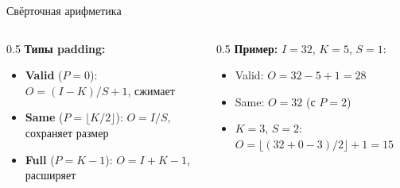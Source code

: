 \documentclass[aspectratio=169, 9pt]{beamer}
\begin{document}
\begin{frame}{Свёрточная арифметика}
  \vspace{0.3em}
  \begin{columns}[T]
    \begin{column}{0.5\textwidth}
      \textbf{Типы padding:}
      \begin{itemize}
        \item \textbf{Valid} ($P=0$): $O = (I - K) / S + 1$, сжимает
        \item \textbf{Same} ($P = \lfloor K/2 \rfloor$): $O = I / S$, сохраняет размер
        \item \textbf{Full} ($P = K-1$): $O = I + K - 1$, расширяет
      \end{itemize}
    \end{column}
    \begin{column}{0.5\textwidth}
      \textbf{Пример:} $I=32$, $K=5$, $S=1$:
      \begin{itemize}
        \item Valid: $O = 32 - 5 + 1 = 28$
        \item Same: $O = 32$ (с $P=2$)
        \item $K=3$, $S=2$: $O = \lfloor (32 + 0 - 3)/2 \rfloor + 1 = 15$
      \end{itemize}
    \end{column}
  \end{columns}
\end{frame}
\end{document}
